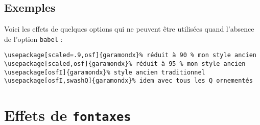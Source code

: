 \documentclass[12pt,english,french]{article}
\begin{document}
%

\subsection{Exemples}

Voici les effets de quelques options qui ne peuvent être utilisées quand l'absence de l'option \texttt{babel} :%

\begin{verbatim}
\usepackage[scaled=.9,osf]{garamondx}% réduit à 90 % mon style ancien 
\usepackage[scaled,osf]{garamondx}% réduit à 95 % mon style ancien 
\usepackage[osfI]{garamondx}% style ancien traditionnel 
\usepackage[osfI,swashQ]{garamondx}% idem avec tous les Q ornementés
\end{verbatim}

\section{Effets de \texttt{fontaxes}}
\end{document}
